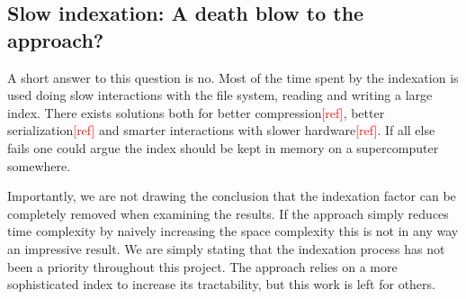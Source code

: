 \documentclass[thesis.tex]{subfiles}
\begin{document}
\subsection*{Slow indexation: A death blow to the approach?}
A short answer to this question is no. Most of the time spent by the indexation is used doing slow interactions with the file system, reading and writing a large index. There exists solutions both for better compression\textcolor{red}{[ref]}, better serialization\textcolor{red}{[ref]} and smarter interactions with slower hardware\textcolor{red}{[ref]}. If all else fails one could argue the index should be kept in memory on a supercomputer somewhere\cite{multiple_sequence_alignment_on_supercomputers}.\\
\par\noindent
Importantly, we are not drawing the conclusion that the indexation factor can be completely removed when examining the results. If the approach simply reduces time complexity by naively increasing the space complexity this is not in any way an impressive result. We are simply stating that the indexation process has not been a priority throughout this project. The approach relies on a more sophisticated index to increase its tractability, but this work is left for others.
\end{document}
